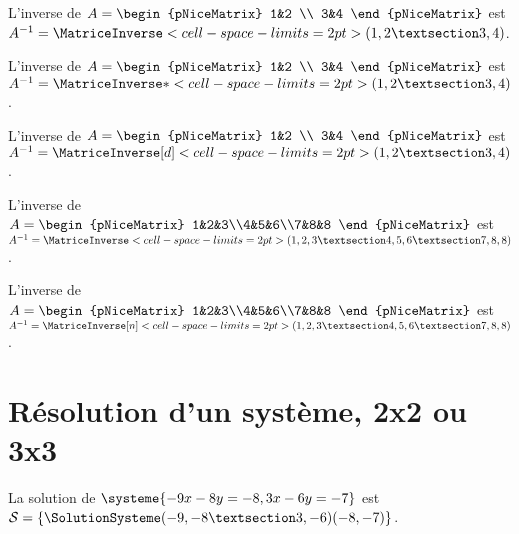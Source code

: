 \documentclass[french,a4paper,10pt]{article}
\begin{document}
\begin{ShowCodeTeX}
L'inverse de $A=\begin{pNiceMatrix} 1&2 \\ 3&4 \end{pNiceMatrix}$ est
$A^{-1}=\MatriceInverse<cell-space-limits=2pt>(1,2 § 3,4)$.
\end{ShowCodeTeX}

\begin{ShowCodeTeX}
L'inverse de $A=\begin{pNiceMatrix} 1&2 \\ 3&4 \end{pNiceMatrix}$ est
$A^{-1}=\MatriceInverse*<cell-space-limits=2pt>(1,2 § 3,4)$.
\end{ShowCodeTeX}

\begin{ShowCodeTeX}
L'inverse de $A=\begin{pNiceMatrix} 1&2 \\ 3&4 \end{pNiceMatrix}$ est
$A^{-1}=\MatriceInverse[d]<cell-space-limits=2pt>(1,2 § 3,4)$.
\end{ShowCodeTeX}

\begin{ShowCodeTeX}
L'inverse de $A=\begin{pNiceMatrix} 1&2&3\\4&5&6\\7&8&8 \end{pNiceMatrix}$ est
$A^{-1}=\MatriceInverse<cell-space-limits=2pt>(1,2,3 § 4,5,6 § 7,8,8)$.
\end{ShowCodeTeX}

\begin{ShowCodeTeX}
L'inverse de $A=\begin{pNiceMatrix} 1&2&3\\4&5&6\\7&8&8 \end{pNiceMatrix}$ est
$A^{-1}=\MatriceInverse[n]<cell-space-limits=2pt>(1,2,3 § 4,5,6 § 7,8,8)$.
\end{ShowCodeTeX}

\section*{Résolution d'un système, 2x2 ou 3x3}

\begin{ShowCodeTeX}
La solution de $\systeme{-9x-8y=-8,3x-6y=-7}$ est $\mathcal{S}=%
\left\lbrace \SolutionSysteme(-9,-8 § 3,-6)(-8,-7) \right\rbrace$.
\end{ShowCodeTeX}
\end{document}
